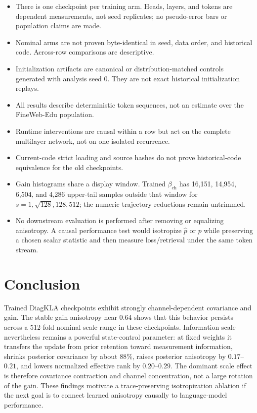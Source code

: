 \documentclass[11pt]{article}
\begin{document}
\begin{itemize}
  \item There is one checkpoint per training arm.  Heads, layers, and tokens are dependent
  measurements, not seed replicates; no pseudo-error bars or population claims are made.
  \item Nominal arms are not proven byte-identical in seed, data order, and historical code.
  Across-row comparisons are descriptive.
  \item Initialization artifacts are canonical or distribution-matched controls generated
  with analysis seed 0.  They are not exact historical initialization replays.
  \item All results describe deterministic token sequences, not an estimate over the
  FineWeb-Edu population.
  \item Runtime interventions are causal within a row but act on the complete multilayer
  network, not on one isolated recurrence.
  \item Current-code strict loading and source hashes do not prove historical-code
  equivalence for the old checkpoints.
  \item Gain histograms share a display window.  Trained
  $\beta_{\mathrm{ch}}$ has 16,151, 14,954, 6,504, and 4,286 upper-tail samples outside that
  window for $s=1,\sqrt{128},128,512$; the numeric trajectory reductions remain untrimmed.
  \item No downstream evaluation is performed after removing or equalizing anisotropy.
  A causal performance test would isotropize $\widehat p$ or $p$ while preserving a chosen
  scalar statistic and then measure loss/retrieval under the same token stream.
\end{itemize}

\section{Conclusion}

Trained DiagKLA checkpoints exhibit strongly channel-dependent covariance and gain.  The
stable gain anisotropy near $0.64$ shows that this behavior persists across a 512-fold nominal
scale range in these checkpoints.  Information scale nevertheless remains a powerful state-control
parameter: at fixed weights it transfers the update from prior retention toward measurement
information, shrinks posterior covariance by about $88\%$, raises posterior anisotropy by
$0.17$--$0.21$, and lowers normalized effective rank by $0.20$--$0.29$.  The dominant scale
effect is therefore covariance contraction and channel concentration, not a large rotation of
the gain.  These findings motivate a trace-preserving isotropization ablation if the next goal
is to connect learned anisotropy causally to language-model performance.
\end{document}
